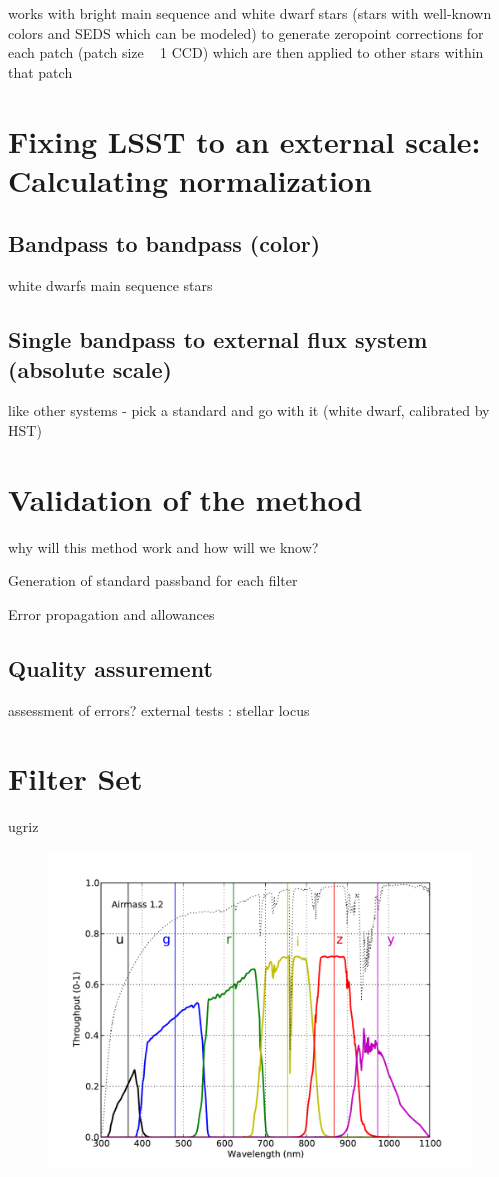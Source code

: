 \documentclass[12pt,preprint]{aastex}
\begin{document}
works with bright main sequence and white dwarf stars (stars with
well-known colors and SEDS which can be modeled) to generate zeropoint
corrections for each patch (patch size ~ 1 CCD) which are then applied
to other stars within that patch 



\section{Fixing LSST to an external scale: Calculating normalization}
\subsection{Bandpass to bandpass (color)}
white dwarfs
main sequence stars
\subsection{Single bandpass to external flux system (absolute scale)}
like other systems - pick a standard and go with it (white dwarf,
calibrated by HST)


\section{Validation of the method}

why will this method work and how will we know?

Generation of standard passband for each filter

Error propagation and allowances


\subsection{Quality assurement}
assessment of errors? 
external tests : stellar locus 


\appendix

\section{Filter Set}
ugriz
\begin{figure}[ht]
\includegraphics[width=5in]{filters}
\end{figure}
\end{document}
